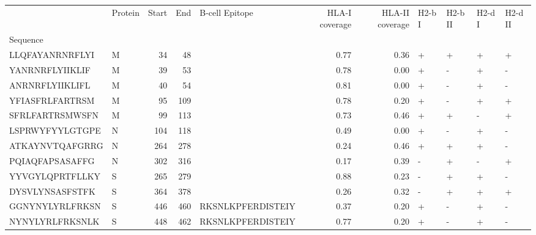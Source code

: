 \begin{tabular}{llrrlrrllll}
\toprule
{} & Protein &  Start &   End &     B-cell Epitope &  HLA-I coverage &  HLA-II coverage & H2-b I & H2-b II & H2-d I & H2-d II \\
Sequence        &         &        &       &                    &                 &                  &        &         &        &         \\
\midrule
LLQFAYANRNRFLYI &       M &     34 &    48 &                    &            0.77 &             0.36 &      + &       + &      + &       + \\
YANRNRFLYIIKLIF &       M &     39 &    53 &                    &            0.78 &             0.00 &      + &       - &      + &       - \\
ANRNRFLYIIKLIFL &       M &     40 &    54 &                    &            0.81 &             0.00 &      + &       - &      + &       - \\
YFIASFRLFARTRSM &       M &     95 &   109 &                    &            0.78 &             0.20 &      + &       - &      + &       + \\
SFRLFARTRSMWSFN &       M &     99 &   113 &                    &            0.73 &             0.46 &      + &       + &      - &       + \\
LSPRWYFYYLGTGPE &       N &    104 &   118 &                    &            0.49 &             0.00 &      + &       - &      + &       - \\
ATKAYNVTQAFGRRG &       N &    264 &   278 &                    &            0.24 &             0.46 &      + &       + &      + &       - \\
PQIAQFAPSASAFFG &       N &    302 &   316 &                    &            0.17 &             0.39 &      - &       + &      - &       + \\
YYVGYLQPRTFLLKY &       S &    265 &   279 &                    &            0.88 &             0.23 &      - &       + &      + &       - \\
DYSVLYNSASFSTFK &       S &    364 &   378 &                    &            0.26 &             0.32 &      - &       + &      + &       + \\
GGNYNYLYRLFRKSN &       S &    446 &   460 &  RKSNLKPFERDISTEIY &            0.37 &             0.20 &      + &       - &      + &       - \\
NYNYLYRLFRKSNLK &       S &    448 &   462 &  RKSNLKPFERDISTEIY &            0.77 &             0.20 &      + &       - &      + &       - \\

\end{tabular}
